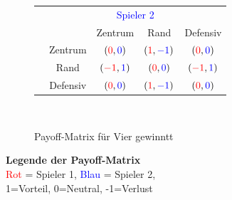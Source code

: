 \begin{center}
	\begin{figure}[h]
		\centering
		\begin{tabular}{cc|c|c|c}
			\multicolumn{1}{c}{} & \multicolumn{4}{c}{\textcolor{blue}{Spieler 2}} \\
			&	& Zentrum & Rand & Defensiv \\
			\cline{2-5}
			\multirow{3}{*}{\rotatebox{90}{\textcolor{red}{Spieler 1}}} & Zentrum & $(\textcolor{red}{0},\textcolor{blue}{0})$ & $(\textcolor{red}{1},\textcolor{blue}{-1})$ & $(\textcolor{red}{0},\textcolor{blue}{0})$ \\
			\cline{3-5}
			&Rand& $(\textcolor{red}{-1},\textcolor{blue}{1})$ & $(\textcolor{red}{0},\textcolor{blue}{0})$ & $(\textcolor{red}{-1},\textcolor{blue}{1})$ \\
			\cline{3-5}
		&Defensiv& $(\textcolor{red}{0},\textcolor{blue}{0})$ & $(\textcolor{red}{1},\textcolor{blue}{-1})$ & $(\textcolor{red}{0},\textcolor{blue}{0})$ \\
		\end{tabular}\\
		\caption[Payoff-Matrix für Vier gewinnt]{Payoff-Matrix für Vier gewinntt}
		\label{fig:payoff}
	\end{figure}
\end{center}

\begin{minipage}{\linewidth}
	\centering
	 \textbf{Legende der Payoff-Matrix}\\
	\textcolor{red}{Rot} = Spieler 1, \textcolor{blue}{Blau} = Spieler 2,\\
	1=Vorteil, 0=Neutral, -1=Verlust
\end{minipage}
 